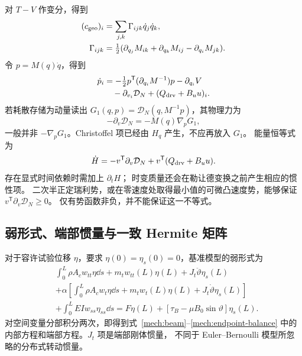 对 $T-V$ 作变分，得到
\begin{align}
 (c_{\rm geo})_i&=\sum_{j,k}\Gamma_{ijk}\dot q_j\dot q_k,\nonumber\\
 \Gamma_{ijk}&=\tfrac12
   (\partial_{q_j}M_{ik}+\partial_{q_k}M_{ij}
                         -\partial_{q_i}M_{jk}).
 \label{sm:christoffel}
\end{align}
令 $p=M(q)\dot q$，得到
\begin{align}
 \dot p_i&=-\tfrac12p^{\mathsf T}(\partial_{q_i}M^{-1})p
       -\partial_{q_i}V\nonumber\\
 &\quad-\partial_{v_i}\mathcal D_N+(Q_{\rm drv}+B_u u)_i.
 \label{sm:variable-mass-momentum}
\end{align}
若耗散存储为动量读出 $G_1(q,p)=\mathcal D_N(q,M^{-1}p)$，其物理力为
\begin{equation}
 -\partial_v\mathcal D_N=-M(q)\nabla_pG_1,
 \label{sm:rayleigh-momentum}
\end{equation}
一般并非 $-\nabla_pG_1$。Christoffel 项已经由 $H_q$ 产生，不应再放入 $G_1$。
能量恒等式为
\begin{equation}
 \dot H=-v^{\mathsf T}\partial_v\mathcal D_N
              +v^{\mathsf T}(Q_{\rm drv}+B_u u).
 \label{sm:general-power}
\end{equation}
存在显式时间依赖时需加上 $\partial_tH$；
时变质量还会在勒让德变换之前产生相应的惯性项。
二次半正定瑞利势，或在零速度处取得最小值的可微凸速度势，能够保证
$v^{\mathsf T}\partial_v\mathcal D_N\ge0$。
仅有势函数非负，并不能保证这一不等式。

\subsection{弱形式、端部惯量与一致 Hermite 矩阵}
\label{sm:weak-form}
对于容许试验位移 $\eta$，要求 $\eta(0)=\eta_s(0)=0$，基准模型的弱形式为
\begin{align}
 &\int_0^L\!\rho A_c w_{tt}\eta\dd s
       +m_tw_{tt}(L)\eta(L)+J_t\ddot\vartheta\eta_s(L)\nonumber\\
 &+\alpha\left[
       \int_0^L\!\rho A_c w_t\eta\dd s
       +m_tw_t(L)\eta(L)+J_t\dot\vartheta\eta_s(L)\right]\nonumber\\
 &+\int_0^L\!EIw_{ss}\eta_{ss}\dd s
       =F\eta(L)+[\tau_B-\mu B_0\sin\vartheta]\eta_s(L).
 \label{sm:beam-weak}
\end{align}
对空间变量分部积分两次，即得到式~\eqref{mech:beam}--\eqref{mech:endpoint-balance}
中的内部方程和端部方程。$J_t$ 项是端部刚体惯量，
不同于 Euler--Bernoulli 模型所忽略的分布式转动惯量。


